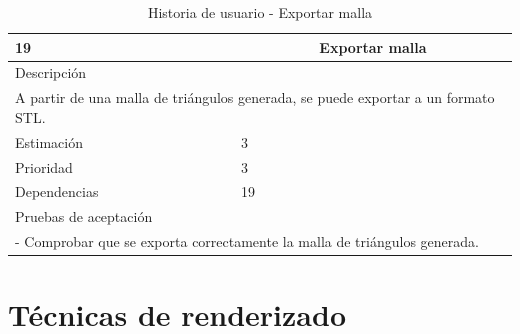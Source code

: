 \begin{table}[H]
	\begin{center}
		\begin{tabular} {|l|c|l|}
			\hline
			19 & \multicolumn{2}{c|}{Exportar malla} \\ \hline \hline
			\multicolumn{3}{|l|}{Descripción} \\ \hline
			\multicolumn{3}{|p{12cm}|}{A partir de una malla de triángulos generada, se puede exportar a un formato STL.} \\ \hline
			\multicolumn{2}{|l|}{Estimación} & 3 \\ \hline
			\multicolumn{2}{|l|}{Prioridad} & 3 \\ \hline
			\multicolumn{2}{|l|}{Dependencias} & 19 \\ \hline
			\multicolumn{3}{|l|}{Pruebas de aceptación} \\ \hline
			\multicolumn{3}{|p{12cm}|}{ - Comprobar que se exporta correctamente la malla de triángulos generada.} \\ \hline
		\end{tabular}
	\end{center}
	\caption{Historia de usuario - Exportar malla}
	\label{tab:hu_exportar_malla}
\end{table}

\section{Técnicas de renderizado}

